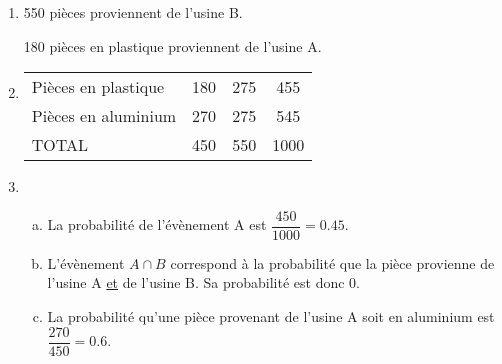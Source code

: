 \documentclass[table]{beamer}
\begin{document}
\begin{frame}
	\begin{enumerate}
		\color{red}
		\item 550 pièces proviennent de l'usine B.

		      180 pièces en plastique proviennent de l'usine A.
		\item \begin{center}
			      \begin{tabular}{l|c|c|c|}
				      \cline{2-4}
				                                                                        & \cellcolor[HTML]{00D2CB}{\color[HTML]{000000} Usine A} & \cellcolor[HTML]{00D2CB}{\color[HTML]{000000} Usine B} & \cellcolor[HTML]{00D2CB}{\color[HTML]{000000} TOTAL} \\ \hline
				      \multicolumn{1}{|l|}{\cellcolor[HTML]{00D2CB}Pièces en plastique} & 180                                                    & 275                                                    & 455                                                  \\ \hline
				      \multicolumn{1}{|l|}{\cellcolor[HTML]{00D2CB}Pièces en aluminium} & 270                                                    & 275                                                    & 545                                                  \\ \hline
				      \multicolumn{1}{|l|}{\cellcolor[HTML]{00D2CB}TOTAL}               & 450                                                    & 550                                                    & 1000                                                 \\ \hline
			      \end{tabular}
		      \end{center}
		\item \begin{enumerate}[a.]
			      \color{red}
			      \item La probabilité de l'évènement A est $\dfrac{450}{1000} = 0.45$.
			      \item L'évènement $A∩B$ correspond à la probabilité que la pièce provienne de l'usine A \uline{et} de l'usine B. Sa probabilité est donc $0$.
			      \item La probabilité qu'une pièce provenant de l'usine A soit en aluminium est $\dfrac{270}{450} = 0.6$.
		      \end{enumerate}
	\end{enumerate}
\end{frame}
\end{document}
